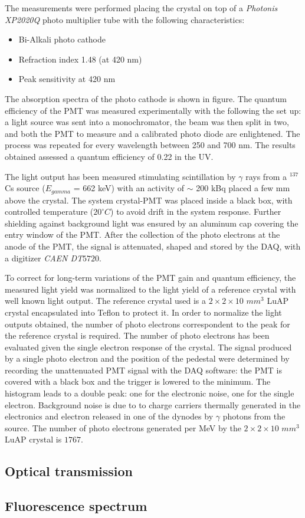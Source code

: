 The measurements were performed placing the crystal on top of a \textit{Photonis XP2020Q} photo multiplier tube with the following characteristics:
\begin{itemize}
\item Bi-Alkali photo cathode
\item Refraction index 1.48 (at 420 nm)
\item Peak sensitivity at 420 nm
\end{itemize}
The absorption spectra of the photo cathode is shown in figure.
The quantum efficiency of the PMT was measured experimentally with the following the set up: a light source was sent into a monochromator, the beam was then split in two, and both the PMT to measure and a calibrated photo diode are enlightened. The process was repeated for every wavelength between 250 and 700 nm. The results obtained assessed a quantum efficiency of 0.22 in the UV.

The light output has been measured stimulating scintillation by $\gamma$ rays from a $^{137}$Cs source ($E_{gamma}$ = 662 keV) with an activity of $\sim$ 200 kBq placed a few mm above the crystal. The system crystal-PMT was placed inside a black box, with controlled temperature ($20^{\circ}C$) to avoid drift in the system response.
Further shielding against background light was ensured by an aluminum cap covering the entry window of the PMT.
After the collection of the photo electrons at the anode of the PMT, the signal is attenuated, shaped and stored by the DAQ, with a digitizer \textit{CAEN DT$5720$}.

To correct for long-term variations of the PMT gain and quantum efficiency, the measured light yield was normalized to the light yield of a reference crystal with well known light output.
The reference crystal used is a $2\times 2\times 10$ $mm^{3}$ LuAP crystal encapsulated into Teflon to protect it. In order to normalize the light outputs obtained, the number of photo electrons correspondent to the peak for the reference crystal is required. The number of photo electrons has been evaluated given the single electron response of the crystal. 
The signal produced by a single photo electron and the position of the pedestal were determined by recording the unattenuated PMT signal with the DAQ software: the PMT is covered with a black box and the trigger is lowered to the minimum. The histogram leads to a double peak: one for the electronic noise, one for the single electron. Background noise is due to to charge carriers thermally generated in the electronics and electron released in one of the dynodes by $\gamma$ photons from the source.
The number of photo electrons generated per MeV by the $2\times 2\times 10$ $mm^{3}$ LuAP crystal is $1767$.


\subsection{Optical transmission}
\subsection{Fluorescence spectrum}